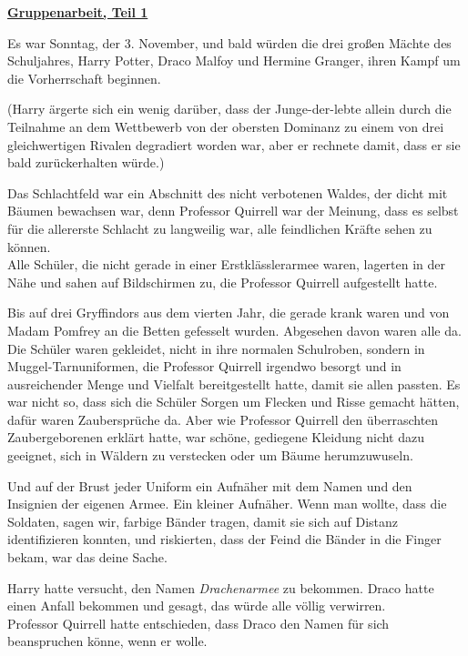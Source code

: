 

\hypertarget{gruppenarbeit-teil-1}{%

\textbf{\uline{Gruppenarbeit, Teil 1}}

Es war Sonntag, der 3. November, und bald würden die drei großen Mächte des Schuljahres, Harry Potter, Draco Malfoy und Hermine Granger, ihren Kampf um die Vorherrschaft beginnen.

(Harry ärgerte sich ein wenig darüber, dass der Junge-der-lebte allein durch die Teilnahme an dem Wettbewerb von der obersten Dominanz zu einem von drei gleichwertigen Rivalen degradiert worden war, aber er rechnete damit, dass er sie bald zurückerhalten würde.)

Das Schlachtfeld war ein Abschnitt des nicht verbotenen Waldes, der dicht mit Bäumen bewachsen war, denn Professor Quirrell war der Meinung, dass es selbst für die allererste Schlacht zu langweilig war, alle feindlichen Kräfte sehen zu können.\\ Alle Schüler, die nicht gerade in einer Erstklässlerarmee waren, lagerten in der Nähe und sahen auf Bildschirmen zu, die Professor Quirrell aufgestellt hatte.

Bis auf drei Gryffindors aus dem vierten Jahr, die gerade krank waren und von Madam Pomfrey an die Betten gefesselt wurden. Abgesehen davon waren alle da. Die Schüler waren gekleidet, nicht in ihre normalen Schulroben, sondern in Muggel-Tarnuniformen, die Professor Quirrell irgendwo besorgt und in ausreichender Menge und Vielfalt bereitgestellt hatte, damit sie allen passten. Es war nicht so, dass sich die Schüler Sorgen um Flecken und Risse gemacht hätten, dafür waren Zaubersprüche da. Aber wie Professor Quirrell den überraschten Zaubergeborenen erklärt hatte, war schöne, gediegene Kleidung nicht dazu geeignet, sich in Wäldern zu verstecken oder um Bäume herumzuwuseln.

Und auf der Brust jeder Uniform ein Aufnäher mit dem Namen und den Insignien der eigenen Armee. Ein kleiner Aufnäher. Wenn man wollte, dass die Soldaten, sagen wir, farbige Bänder tragen, damit sie sich auf Distanz identifizieren konnten, und riskierten, dass der Feind die Bänder in die Finger bekam, war das deine Sache.

Harry hatte versucht, den Namen \emph{Drachenarmee} zu bekommen. Draco hatte einen Anfall bekommen und gesagt, das würde alle völlig verwirren.\\ Professor Quirrell hatte entschieden, dass Draco den Namen für sich beanspruchen könne, wenn er wolle.

}
